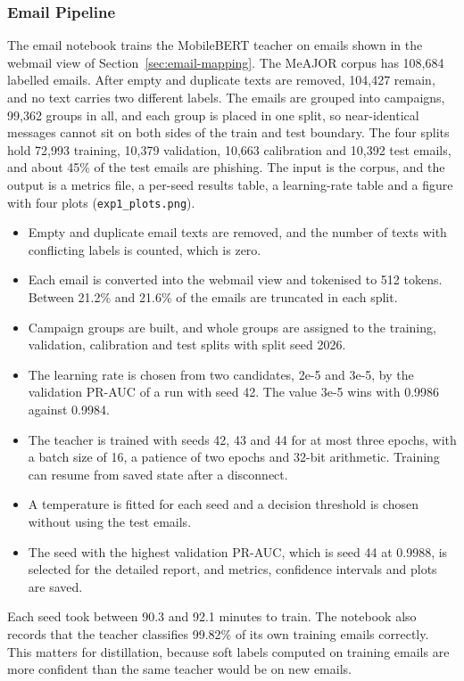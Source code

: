 \documentclass{FastFyp}
\begin{document}
\subsubsection{Email Pipeline}
\label{sec:impl-email}
The email notebook trains the MobileBERT teacher on emails shown in the webmail view of Section~\ref{sec:email-mapping}. The MeAJOR corpus has 108,684 labelled emails. After empty and duplicate texts are removed, 104,427 remain, and no text carries two different labels. The emails are grouped into campaigns, 99,362 groups in all, and each group is placed in one split, so near-identical messages cannot sit on both sides of the train and test boundary. The four splits hold 72,993 training, 10,379 validation, 10,663 calibration and 10,392 test emails, and about 45\% of the test emails are phishing. The input is the corpus, and the output is a metrics file, a per-seed results table, a learning-rate table and a figure with four plots (\texttt{exp1\_plots.png}).
\begin{itemize}
	\item Empty and duplicate email texts are removed, and the number of texts with conflicting labels is counted, which is zero.
	\item Each email is converted into the webmail view and tokenised to 512 tokens. Between 21.2\% and 21.6\% of the emails are truncated in each split.
	\item Campaign groups are built, and whole groups are assigned to the training, validation, calibration and test splits with split seed 2026.
	\item The learning rate is chosen from two candidates, 2e-5 and 3e-5, by the validation PR-AUC of a run with seed 42. The value 3e-5 wins with 0.9986 against 0.9984.
	\item The teacher is trained with seeds 42, 43 and 44 for at most three epochs, with a batch size of 16, a patience of two epochs and 32-bit arithmetic. Training can resume from saved state after a disconnect.
	\item A temperature is fitted for each seed and a decision threshold is chosen without using the test emails. 
	\item The seed with the highest validation PR-AUC, which is seed 44 at 0.9988, is selected for the detailed report, and metrics, confidence intervals and plots are saved.
\end{itemize}
Each seed took between 90.3 and 92.1 minutes to train. The notebook also records that the teacher classifies 99.82\% of its own training emails correctly. This matters for distillation, because soft labels computed on training emails are more confident than the same teacher would be on new emails. 
\end{document}
